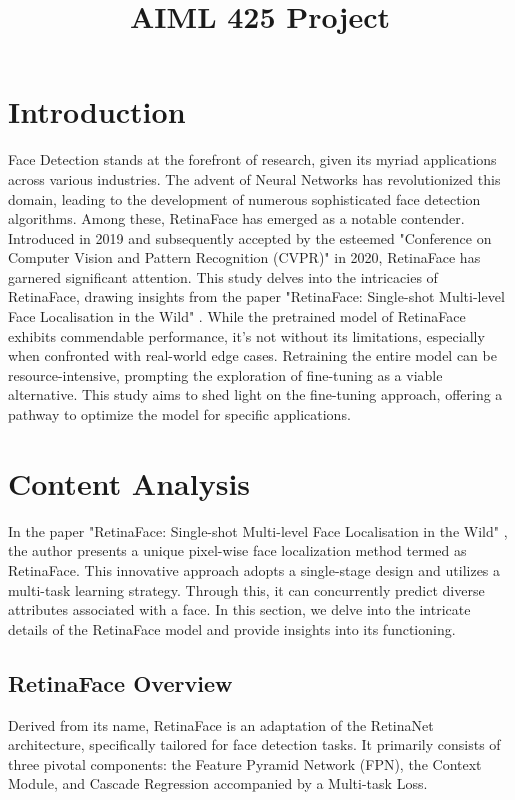 \documentclass{article}
\title{AIML 425 Project}
\begin{document}
%
\maketitle
%
\section{Introduction}
\label{sec:intro}

Face Detection stands at the forefront of research, given its myriad applications across various industries. 
The advent of Neural Networks has revolutionized this domain, leading to the development of numerous sophisticated face detection algorithms. 
Among these, RetinaFace has emerged as a notable contender. 
Introduced in 2019 and subsequently accepted by the esteemed "Conference on Computer Vision and Pattern Recognition (CVPR)" in 2020, 
RetinaFace has garnered significant attention. 
This study delves into the intricacies of RetinaFace, 
drawing insights from the paper "RetinaFace: Single-shot Multi-level Face Localisation in the Wild" \cite{deng2020retinaface}. 
While the pretrained model of RetinaFace exhibits commendable performance, it's not without its limitations, 
especially when confronted with real-world edge cases. 
Retraining the entire model can be resource-intensive, prompting the exploration of fine-tuning as a viable alternative. 
This study aims to shed light on the fine-tuning approach, offering a pathway to optimize the model for specific applications.

\section{Content Analysis}
\label{sec:content}

In the paper "RetinaFace: Single-shot Multi-level Face Localisation in the Wild" \cite{deng2020retinaface}, the author presents a unique pixel-wise face localization method termed as RetinaFace. This innovative approach adopts a single-stage design and utilizes a multi-task learning strategy. Through this, it can concurrently predict diverse attributes associated with a face. In this section, we delve into the intricate details of the RetinaFace model and provide insights into its functioning.

\subsection{RetinaFace Overview}

Derived from its name, RetinaFace is an adaptation of the RetinaNet architecture, specifically tailored for face detection tasks. It primarily consists of three pivotal components: the Feature Pyramid Network (FPN), the Context Module, and Cascade Regression accompanied by a Multi-task Loss.
\end{document}

